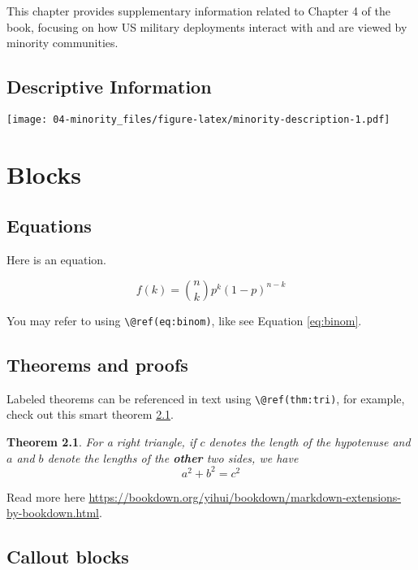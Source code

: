 \documentclass[
]{book}
\newtheorem{theorem}{Theorem}[chapter]
\theoremstyle{definition}
\theoremstyle{definition}
\theoremstyle{definition}
\theoremstyle{definition}
\theoremstyle{remark}
\begin{document}
This chapter provides supplementary information related to Chapter 4 of the book, focusing on how US military deployments interact with and are viewed by minority communities.

\hypertarget{descriptive-information-1}{%
\section{Descriptive Information}\label{descriptive-information-1}}

\texttt{[image: 04-minority\_files/figure-latex/minority-description-1.pdf]}

\hypertarget{blocks}{%
\chapter{Blocks}\label{blocks}}

\hypertarget{equations}{%
\section{Equations}\label{equations}}

Here is an equation.

\begin{equation} 
  f\left(k\right) = \binom{n}{k} p^k\left(1-p\right)^{n-k}
  \label{eq:binom}
\end{equation}

You may refer to using \texttt{\textbackslash{}@ref(eq:binom)}, like see Equation \eqref{eq:binom}.

\hypertarget{theorems-and-proofs}{%
\section{Theorems and proofs}\label{theorems-and-proofs}}

Labeled theorems can be referenced in text using \texttt{\textbackslash{}@ref(thm:tri)}, for example, check out this smart theorem \ref{thm:tri}.

\begin{theorem}
\protect\hypertarget{thm:tri}{}\label{thm:tri}For a right triangle, if \(c\) denotes the \emph{length} of the hypotenuse
and \(a\) and \(b\) denote the lengths of the \textbf{other} two sides, we have
\[a^2 + b^2 = c^2\]
\end{theorem}

Read more here \url{https://bookdown.org/yihui/bookdown/markdown-extensions-by-bookdown.html}.

\hypertarget{callout-blocks}{%
\section{Callout blocks}\label{callout-blocks}}
\end{document}
